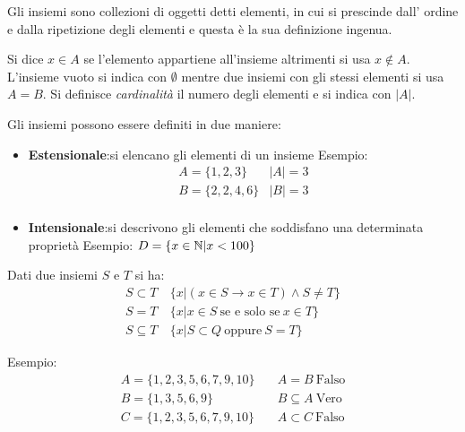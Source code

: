 Gli insiemi sono collezioni di oggetti detti elementi, in cui si prescinde dall'
ordine e dalla ripetizione degli elementi e questa è la sua definizione ingenua.

Si dice $x \in A$ se l'elemento appartiene all'insieme altrimenti si usa $x \not \in A$.
L'insieme vuoto si indica con $\emptyset$ mentre due insiemi con gli stessi elementi si usa $A = B$.\newline
Si definisce \textit{cardinalità} il numero degli elementi e si indica con $|A|$.

Gli insiemi possono essere definiti in due maniere:
\begin{itemize}
  \item \textbf{Estensionale}:si elencano gli elementi di un insieme\newline
        Esempio:
        \begin{equation*}
        \begin{split}
            A = \{1,2,3\} & |A| = 3 \\
            B = \{2,2,4,6\} & |B| = 3 \\
        \end{split}
        \end{equation*}
  \item \textbf{Intensionale}:si descrivono gli elementi che soddisfano una determinata proprietà\newline
        Esempio: \newline
        $D = \{x \in \mathbb{N} | x < 100\}$
\end{itemize}

Dati due insiemi $S$ e $T$ si ha:
\begin{align*}
  S \subset T & \ \{x | (x \in S \rightarrow x \in T) \land S \not = T \} \\
  S = T & \  \{x | x \in S \ \text{se e solo se} \ x \in T \} \\
  S \subseteq T & \ \{x | S \subset Q \ \text{oppure} \ S = T \}
\end{align*}

Esempio:
\begin{align*}
A = \{1,2,3,5,6,7,9,10 \}  & \quad A = B  \ \text{Falso}\\
B = \{1,3,5,6,9 \}  & \quad B \subseteq A \ \text{Vero}\\
C = \{1,2,3,5,6,7,9,10 \} & \quad A \subset C \ \text{Falso}\\
\end{align*}

